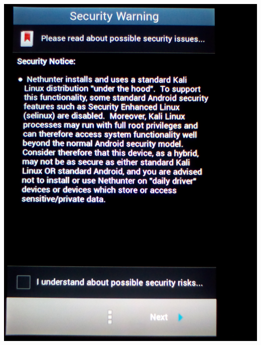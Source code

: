 \documentclass[11pt,a4paper]{article}
\begin{document}
\includegraphics[scale=0.09]{./Image/img14} \\ \\
\end{document}
